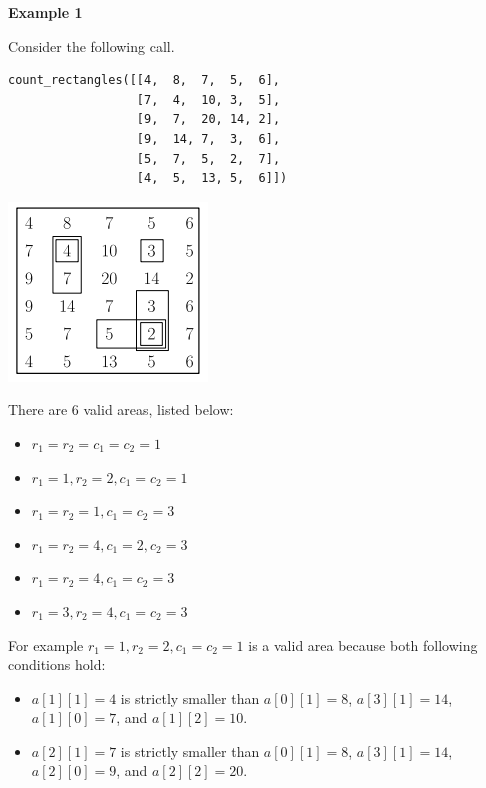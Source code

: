 \textbf{Example 1}

Consider the following call.

\begin{verbatim}
count_rectangles([[4,  8,  7,  5,  6],
                  [7,  4,  10, 3,  5],
                  [9,  7,  20, 14, 2],
                  [9,  14, 7,  3,  6],
                  [5,  7,  5,  2,  7],
                  [4,  5,  13, 5,  6]])
\end{verbatim}

\includegraphics{1.png}


There are $6$ valid areas, listed below:
\begin{itemize}
\item $r_1 = r_2 = c_1 = c_2 = 1$
\item $r_1 = 1, r_2 = 2, c_1 = c_2 = 1$
\item $r_1 = r_2 = 1, c_1 = c_2 = 3$
\item $r_1 = r_2 = 4, c_1 = 2, c_2 = 3$
\item $r_1 = r_2 = 4, c_1 = c_2 = 3$
\item $r_1 = 3, r_2 = 4, c_1 = c_2 = 3$
\end{itemize}

For example $r_1 = 1, r_2 = 2, c_1 = c_2 = 1$ is a valid area because both following conditions hold:
\begin{itemize}
\item $a[1][1]=4$ is strictly smaller than $a[0][1]=8$, $a[3][1]=14$, $a[1][0]=7$, and $a[1][2]=10$.
\item $a[2][1]=7$ is strictly smaller than $a[0][1]=8$, $a[3][1]=14$, $a[2][0]=9$, and $a[2][2]=20$.
\end{itemize}

